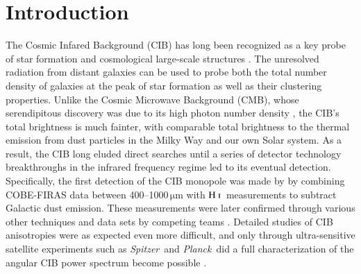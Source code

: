 \documentclass{aa}
\def\Planck{\textit{Planck}}
\def\Spitzer{\textit{Spitzer}}
\newcommand{\mathsc}[1]{{\normalfont\textsc{#1}}}
\newcommand{\hi}{\ensuremath{\mathsc {H\ i}}}
\begin{document}

   \maketitle

   \setcounter{tocdepth}{2}
   \tableofcontents


\section{Introduction}

The Cosmic Infared Background (CIB) has long been recognized as a key probe of star formation and cosmological large-scale structures \citep{partridge1967}. The unresolved radiation from distant galaxies can be used to probe both the total number density of galaxies at the peak of star formation as well as their clustering properties. Unlike the Cosmic Microwave Background (CMB), whose serendipitous discovery was due to its high photon number density \citep{penzias:1965}, the CIB's total brightness is much fainter, with comparable total brightness to the thermal emission from dust particles in the Milky Way and our own Solar system. As a result, the CIB long eluded direct searches until a series of detector technology breakthroughs in the infrared frequency regime led to its eventual detection. Specifically, the first detection of the CIB monopole was made by \citet{puget1996} by combining COBE-FIRAS data between 400--1000\,$\mathrm{\mu m}$ with \hi\ measurements to subtract Galactic dust emission. These measurements were later confirmed through various other techniques and data sets by competing teams \citep[e.g.,][]{fixsen1998, schlegel1998, lagache:1999, penin:2012}. Detailed studies of CIB anisotropies were as expected even more difficult, and only through ultra-sensitive satellite experiments such as \Spitzer\ and \Planck\  did a full characterization of the angular CIB power spectrum become possible \citep{dole:2006,planck2013-pip56, planck2016-XLVIII, lenz:2019, odegard:2019}.
\end{document}
